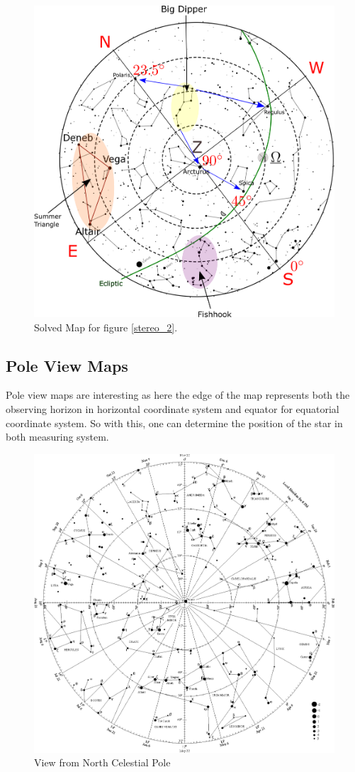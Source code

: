 \documentclass[a4paper,12pt]{extarticle}
\begin{document}
\begin{figure}[H]
    \centering
    \includegraphics[width=0.9\linewidth]{solved_map1.png}
    \caption{Solved Map for figure \ref{stereo_2}.}
    \label{stereo_3}
\end{figure}
\clearpage
\subsection{Pole View Maps}
Pole view maps are interesting as here the edge of the map represents both the observing horizon in horizontal coordinate system and equator for equatorial coordinate system. So with this, one can determine the position of the star in both measuring system. \\
\begin{figure}[H]
    \centering
    \includegraphics[width=0.9 \linewidth]{ncp_view.eps}
    \caption{View from North Celestial Pole}
\end{figure}
\end{document}
